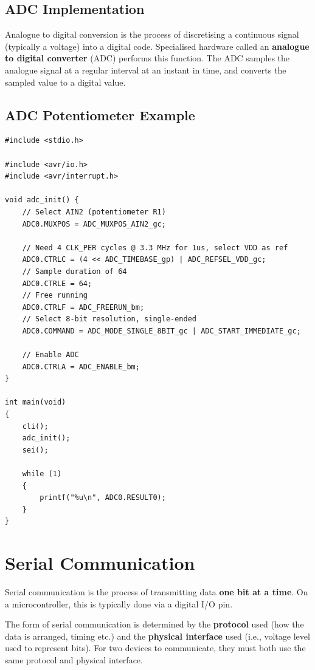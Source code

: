 \documentclass[a4paper]{report}
\begin{document}
\subsection{ADC Implementation}
Analogue to digital conversion is the process of discretising a continuous signal (typically a voltage)
into a digital code. Specialised hardware called an \textbf{analogue to digital converter} (ADC)
performs this function. The ADC samples the analogue signal at a regular interval at an instant in time, and
converts the sampled value to a digital value.
\subsection{ADC Potentiometer Example}
\begin{verbatim}
#include <stdio.h>

#include <avr/io.h>
#include <avr/interrupt.h>

void adc_init() {
    // Select AIN2 (potentiometer R1)
    ADC0.MUXPOS = ADC_MUXPOS_AIN2_gc;

    // Need 4 CLK_PER cycles @ 3.3 MHz for 1us, select VDD as ref
    ADC0.CTRLC = (4 << ADC_TIMEBASE_gp) | ADC_REFSEL_VDD_gc;
    // Sample duration of 64
    ADC0.CTRLE = 64;
    // Free running
    ADC0.CTRLF = ADC_FREERUN_bm;
    // Select 8-bit resolution, single-ended
    ADC0.COMMAND = ADC_MODE_SINGLE_8BIT_gc | ADC_START_IMMEDIATE_gc;

    // Enable ADC
    ADC0.CTRLA = ADC_ENABLE_bm;
}

int main(void)
{
    cli();
    adc_init();
    sei();

    while (1)
    {
        printf("%u\n", ADC0.RESULT0);
    }
}
\end{verbatim}
\section{Serial Communication}
Serial communication is the process of transmitting data \textbf{one bit at a time}.
On a microcontroller, this is typically done via a digital I/O pin.

The form of serial communication is determined by the \textbf{protocol} used (how the data is arranged, timing etc.)
and the \textbf{physical interface} used (i.e., voltage level used to represent bits).
For two devices to communicate, they must both use the same protocol and physical interface.
\end{document}
